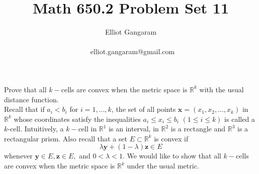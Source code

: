 \documentclass[12pt]{article}
\title{Math 650.2  Problem Set 11}
\author{Elliot Gangaram\\
\date{}
\ elliot.gangaram@gmail.com \\}
\begin{document}
\maketitle

\problem Prove that all $k-$cells are convex when the metric space is $\mathbb{R}^{k}$ with the usual distance function. \\ 

Recall that if $a_{i}<b_{i}$ for $i=1, \ldots, k$, the set of all points $\textbf{x}=(x_{1}, x_{2}, \ldots, x_{k})$ in $\mathbb{R}^{k}$ whose coordinates satisfy the inequalities $a_{i} \leq x_{i} \leq b_{i}$ $(1 \leq i \leq k)$ is called a $k$-cell. Intuitively, a $k-$cell in $\mathbb{R}^{1}$ is an interval, in $\mathbb{R}^{2}$ is a rectangle and $\mathbb{R}^{3}$ is a rectangular prism. Also recall that a set $E \subset \mathbb{R}^{k}$ is convex if 
\begin{equation}
\lambda \textbf{y} + (1-\lambda) \textbf{z} \in E
\end{equation}
whenever $\textbf{y} \in E, \textbf{z} \in E,$ and $0<\lambda<1$. We would like to show that all $k-$cells are convex when the metric space is $\mathbb{R}^{k}$ under the usual metric. \\ \\ 
\end{document}
